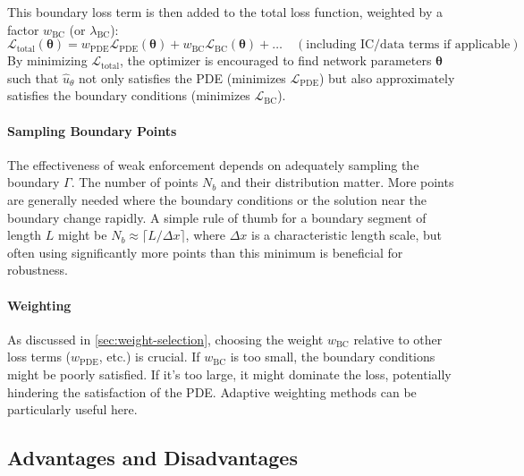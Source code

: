 This boundary loss term is then added to the total loss function, weighted by a factor $w_{\text{BC}}$ (or $\lambda_{\text{BC}}$):
%
\begin{equation*}
\mathcal{L}_{\text{total}}(\boldsymbol{\theta}) = w_{\text{PDE}}\mathcal{L}_{\text{PDE}}(\boldsymbol{\theta}) + w_{\text{BC}}\mathcal{L}_{\text{BC}}(\boldsymbol{\theta}) + \dots \quad (\text{including IC/data terms if applicable})
\end{equation*}
%
By minimizing $\mathcal{L}_{\text{total}}$, the optimizer is encouraged to find network parameters $\boldsymbol{\theta}$ such that $\hat{u}_\theta$ not only satisfies the PDE (minimizes $\mathcal{L}_{\text{PDE}}$) but also approximately satisfies the boundary conditions (minimizes $\mathcal{L}_{\text{BC}}$).

\paragraph{Sampling Boundary Points}
The effectiveness of weak enforcement depends on adequately sampling the boundary $\Gamma$. The number of points $N_b$ and their distribution matter. More points are generally needed where the boundary conditions or the solution near the boundary change rapidly. A simple rule of thumb for a boundary segment of length $L$ might be $N_b \approx \lceil L / \Delta x \rceil$, where $\Delta x$ is a characteristic length scale, but often using significantly more points than this minimum is beneficial for robustness.

\paragraph{Weighting}
As discussed in \cref{sec:weight-selection}, choosing the weight $w_{\text{BC}}$ relative to other loss terms ($w_{\text{PDE}}$, etc.) is crucial. If $w_{\text{BC}}$ is too small, the boundary conditions might be poorly satisfied. If it's too large, it might dominate the loss, potentially hindering the satisfaction of the PDE. Adaptive weighting methods can be particularly useful here.

\subsection{Advantages and Disadvantages}

